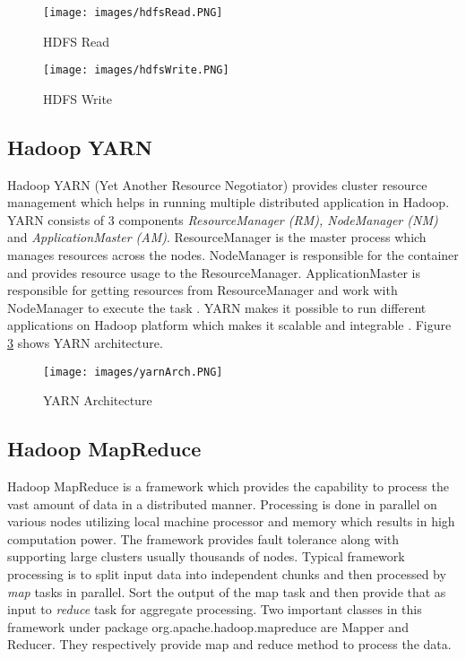 \documentclass[sigconf]{acmart}
\begin{document}
\begin{figure}[!ht]
  \centering\texttt{[image: images/hdfsRead.PNG]}
  \caption{HDFS Read \cite[Ch.\ 3, p. 38]{AchariShiva2015HE}}\label{f:hdfs-read}
\end{figure}

\begin{figure}[!ht]
  \centering\texttt{[image: images/hdfsWrite.PNG]}
  \caption{HDFS Write \cite[Ch.\ 3, p. 39]{AchariShiva2015HE}}\label{f:hdfs-write}
\end{figure}


\subsection{Hadoop YARN}
Hadoop YARN (Yet Another Resource Negotiator) provides cluster resource management which helps in running multiple distributed application in Hadoop. YARN consists of 3 components \emph{ResourceManager (RM), NodeManager (NM)} and \emph{ApplicationMaster (AM)}. ResourceManager is the master process which manages resources across the nodes. NodeManager is responsible for the container and provides resource usage to the ResourceManager. ApplicationMaster is responsible for getting resources from ResourceManager and work with NodeManager to execute the task \cite{www-apache-yarn}. YARN makes it possible to run different applications on Hadoop platform which makes it scalable and integrable \cite[Ch.\ 3, p. 65]{AchariShiva2015HE}.
Figure \ref{f:yarn-arch} shows YARN architecture.
\begin{figure}[!ht]
  \centering\texttt{[image: images/yarnArch.PNG]}
  \caption{YARN Architecture \cite{www-apache-yarn}}\label{f:yarn-arch}
\end{figure}

\subsection{Hadoop MapReduce}
Hadoop MapReduce is a framework which provides the capability to process the vast amount of data in a distributed manner. Processing is done in parallel on various nodes utilizing local machine processor and memory which results in high computation power. The framework provides fault tolerance along with supporting large clusters usually thousands of nodes. Typical framework processing is to split input data into independent chunks and then processed by \emph{map} tasks in parallel. Sort the output of the map task and then provide that as input to \emph{reduce} task for aggregate processing. Two important classes in this framework under package org.apache.hadoop.mapreduce are Mapper and Reducer. They respectively provide map and reduce method to process the data. 
\end{document}
